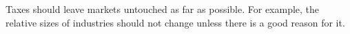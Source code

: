 Taxes should leave markets untouched as far as possible. For example, the relative sizes of industries should not change unless there is a good reason for it.
